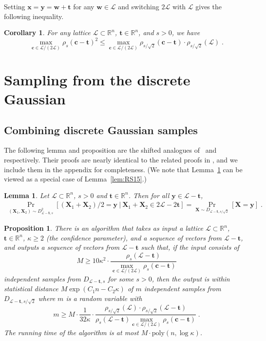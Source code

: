 \documentclass[11pt]{article}
\newtheorem{proposition}[theorem]{Proposition}
\newtheorem{lemma}[theorem]{Lemma}
\newtheorem{corollary}[theorem]{Corollary}
\newcommand{\R}{\ensuremath{\mathbb{R}}}
\renewcommand{\vec}[1]{\ensuremath{\mathbf{#1}}}
\newcommand{\poly}{\mathrm{poly}}
\newcommand{\lat}{\mathcal{L}}
\begin{document}
Setting $\vec{x} = \vec{y} = \vec{w}+\vec{t}$ for any $\vec{w} \in \lat$ and switching $2\lat$ with $\lat$ gives the following inequality.
\begin{corollary}
\label{cor:RSHolder}
For any lattice $\lat\subset\R^n$, $\vec{t} \in \R^n$, and $s > 0$, we have
\[
\max_{\vec{c} \in \lat/(2\lat)} \rho_{s}(\vec{c} - \vec{t})^2 \leq \max_{\vec{c}
\in \lat/(2\lat)} \rho_{s/\sqrt{2}}(\vec{c} - \vec{t}) \cdot \rho_{s/\sqrt{2}}(\lat)
\;.
\]
\end{corollary}

\section{Sampling from the discrete Gaussian}
\label{sec:main-dgs}

\subsection{Combining discrete Gaussian samples}



The following lemma and proposition are the shifted analogues of~\cite[Lemma 3.4]{ADRS15} and~\cite[Proposition 3.5]{ADRS15} respectively. Their proofs are nearly identical to the related proofs in \cite{ADRS15}, and we include them in the appendix for completeness. (We note that Lemma~\ref{lem:sumofgaussians} can be viewed as a special case of Lemma~\ref{lem:RS15}.)

\begin{lemma}
\label{lem:sumofgaussians}
Let $\lat \subset \R^n$, $s > 0$ and $\vec{t} \in \R^n$. Then for all $\vec{y} \in \lat - \vec{t}$,
\begin{align}\label{eq:sumofgaussians}
\Pr_{(\vec{X}_1, \vec{X}_2) \sim D_{\lat-\vec{t}, s}^2}[(\vec{X}_1 + \vec{X}_2)/2 = \vec{y} ~|~ \vec{X}_1 + \vec{X}_2 \in 2\lat - 2\vec{t}] 
= \Pr_{\vec{X} \sim D_{\lat-\vec{t}, s/\sqrt{2}}}[\vec{X} = \vec{y}]
\; .
\end{align}
\end{lemma}



\begin{proposition}
\label{prop:combiner}
There is an algorithm that takes as input a lattice $\lat \subset \R^n$, $\vec{t} \in \R^n$, $\kappa \geq 2$ (the confidence parameter), 
and a sequence of vectors from $\lat - \vec{t}$,
and outputs a sequence of vectors from $\lat - \vec{t}$ such that, if the input consists of 
\[
M \geq 10 \kappa^2\cdot \frac{ \rho_s(\lat - \vec{t})}{\max_{\vec{c} \in \lat/(2\lat)}\rho_s(\vec{c} - \vec{t})}
\]
 independent samples from $D_{\lat - \vec{t}, s}$ for some $s > 0$, then the output is within statistical distance $M \exp(C_1 n-C_2\kappa)$ of $m$ independent samples from $D_{\lat-\vec{t}, s/\sqrt{2}}$ where $m$ is a random variable with
\[
m \geq  M \cdot \frac{1}{32\kappa}\cdot\frac{\rho_{s/\sqrt{2}}(\lat) \cdot \rho_{s/\sqrt{2}}(\lat - \vec{t})}{ \rho_s(\lat - \vec{t})\max_{\vec{c} \in \lat/(2\lat)}\rho_s(\vec{c} - \vec{t})}
\; .
\] 
The running time of the algorithm is at most $M \cdot \poly(n, \log \kappa)$.
\end{proposition}
\end{document}
